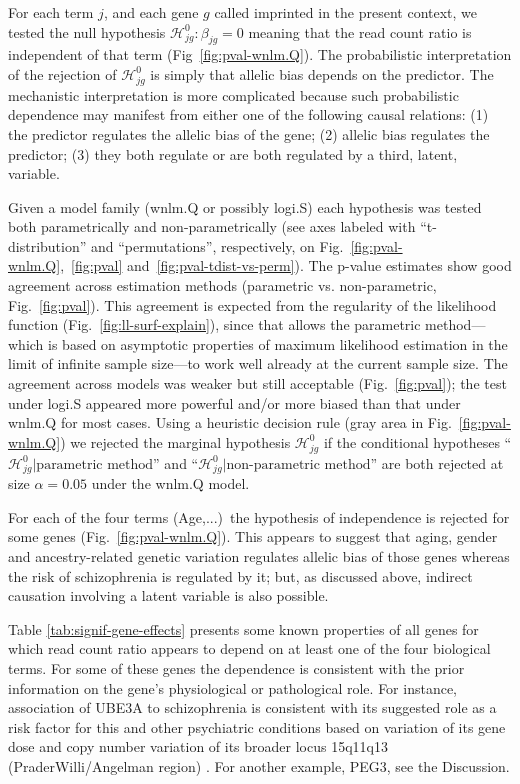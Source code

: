 \documentclass[12pt,letterpaper]{article}
\begin{document}
For each term \(j\), and each gene \(g\) called imprinted in the present
context, we tested the null hypothesis \(\mathcal{H}^0_{jg} : \beta_{jg} = 0\)
meaning that the read count ratio is independent of that term
(Fig~\ref{fig:pval-wnlm.Q}).  The probabilistic interpretation of the
rejection of \(\mathcal{H}^0_{jg}\) is simply that allelic bias depends on
the predictor.  The mechanistic interpretation is more complicated because
such probabilistic dependence may manifest from either one of the following
causal relations: (1) the predictor regulates the allelic bias of the gene;
(2) allelic bias regulates the predictor; (3) they both regulate or are both
regulated by a third, latent, variable.

Given a model family (wnlm.Q or possibly logi.S) each hypothesis was tested
both parametrically and non-parametrically (see axes labeled with
``t-distribution'' and ``permutations'', respectively, on
Fig.~\ref{fig:pval-wnlm.Q},~\ref{fig:pval} and~\ref{fig:pval-tdist-vs-perm}).
The p-value estimates show good agreement across estimation methods
(parametric vs. non-parametric, Fig.~\ref{fig:pval}). This agreement is
expected from the regularity of the likelihood function
(Fig.~\ref{fig:ll-surf-explain}), since that allows the parametric
method---which is based on asymptotic properties of maximum likelihood
estimation in the limit of infinite sample size---to work well already at the
current sample size. The agreement across models was weaker but still
acceptable (Fig.~\ref{fig:pval}); the test under logi.S appeared more powerful
and/or more biased than that under wnlm.Q for most cases. Using a heuristic
decision rule (gray area in Fig.~\ref{fig:pval-wnlm.Q}) we rejected the
marginal hypothesis \(\mathcal{H}^0_{jg}\) if the conditional hypotheses
``\(\mathcal{H}^0_{jg} |\text{parametric method}\)'' and
``\(\mathcal{H}^0_{jg} |\text{non-parametric method}\)'' are both rejected at
size \(\alpha = 0.05\) under the wnlm.Q model.

For each of the four terms (Age,...)~the hypothesis of independence is
rejected for some genes (Fig.~\ref{fig:pval-wnlm.Q}). This appears to suggest
that aging, gender and ancestry-related genetic variation regulates allelic
bias of those genes whereas the risk of schizophrenia is regulated by it; but,
as discussed above, indirect causation involving a latent variable is also
possible.

Table \ref{tab:signif-gene-effects} presents some known properties of all
genes for which read count ratio appears to depend on at least one of the four
biological terms. For some of these genes the dependence is consistent with
the prior information on the gene's physiological or pathological role.  For
instance, association of UBE3A to schizophrenia is consistent with its
suggested role as a risk factor for this and other psychiatric conditions
based on variation of its gene dose and copy number variation of its broader
locus 15q11q13 (PraderWilli/Angelman region) \cite{Sullivan2012,
McNamara2013}.  For another example, PEG3, see the Discussion.
\end{document}
